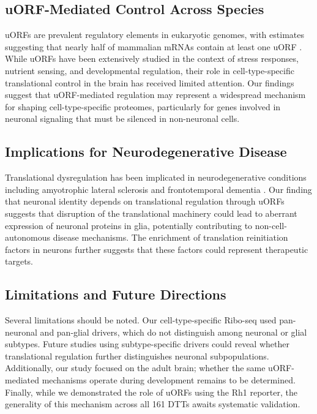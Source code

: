 \documentclass[12pt]{article}
\begin{document}
\subsection{uORF-Mediated Control Across Species}

uORFs are prevalent regulatory elements in eukaryotic genomes, with estimates suggesting that nearly half of mammalian mRNAs contain at least one uORF \citep{johnstone2016upstream, hinnebusch2016translational}. While uORFs have been extensively studied in the context of stress responses, nutrient sensing, and developmental regulation, their role in cell-type-specific translational control in the brain has received limited attention. Our findings suggest that uORF-mediated regulation may represent a widespread mechanism for shaping cell-type-specific proteomes, particularly for genes involved in neuronal signaling that must be silenced in non-neuronal cells.

\subsection{Implications for Neurodegenerative Disease}

Translational dysregulation has been implicated in neurodegenerative conditions including amyotrophic lateral sclerosis and frontotemporal dementia \citep{li2013stress, kanekura2016er}. Our finding that neuronal identity depends on translational regulation through uORFs suggests that disruption of the translational machinery could lead to aberrant expression of neuronal proteins in glia, potentially contributing to non-cell-autonomous disease mechanisms. The enrichment of translation reinitiation factors in neurons further suggests that these factors could represent therapeutic targets.

\subsection{Limitations and Future Directions}

Several limitations should be noted. Our cell-type-specific Ribo-seq used pan-neuronal and pan-glial drivers, which do not distinguish among neuronal or glial subtypes. Future studies using subtype-specific drivers could reveal whether translational regulation further distinguishes neuronal subpopulations. Additionally, our study focused on the adult brain; whether the same uORF-mediated mechanisms operate during development remains to be determined. Finally, while we demonstrated the role of uORFs using the Rh1 reporter, the generality of this mechanism across all 161 DTTs awaits systematic validation.
\end{document}
